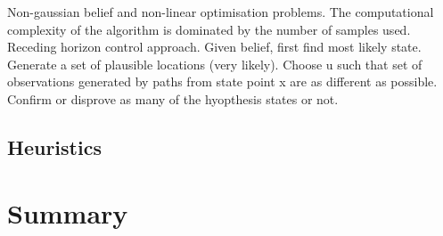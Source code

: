 


\cite{non_gauss_bel_plan_2012} Non-gaussian belief and non-linear optimisation problems. The computational complexity
of the algorithm is dominated by the number of samples used. Receding horizon control approach. Given belief, first 
find most likely state. Generate a set of plausible locations (very likely). Choose u such that set of observations 
generated by paths from state point x are as different as possible. Confirm or disprove as many of the hyopthesis states 
or not.

\subsection{Heuristics}

\cite{next_best_touch}
\cite{CostalNavigation1999}
\cite{dense_entropy_icra_2014}
\cite{Uncer_reduction_heuristic_2015} %

 
\cite{u_aware_grasp_ICRA_2015}
\cite{Li_2015}


\cite{un_water_inspection_icra_2012}
\cite{Bayesian_explor_exploit_2009}
\cite{Macro_uncertainty_2011}


\section{Summary} \label{sec:back_summ}




